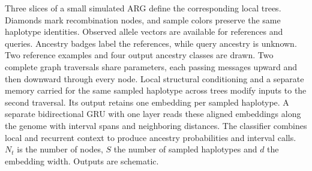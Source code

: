 \caption{Three slices of a small simulated ARG define the corresponding local trees. Diamonds mark recombination nodes, and sample colors preserve the same haplotype identities. Observed allele vectors are available for references and queries. Ancestry badges label the references, while query ancestry is unknown. Two reference examples and four output ancestry classes are drawn. Two complete graph traversals share parameters, each passing messages upward and then downward through every node. Local structural conditioning and a separate memory carried for the same sampled haplotype across trees modify inputs to the second traversal. Its output retains one embedding per sampled haplotype. A separate bidirectional GRU with one layer reads these aligned embeddings along the genome with interval spans and neighboring distances. The classifier combines local and recurrent context to produce ancestry probabilities and interval calls. $N_t$ is the number of nodes, $S$ the number of sampled haplotypes and $d$ the embedding width. Outputs are schematic.}
